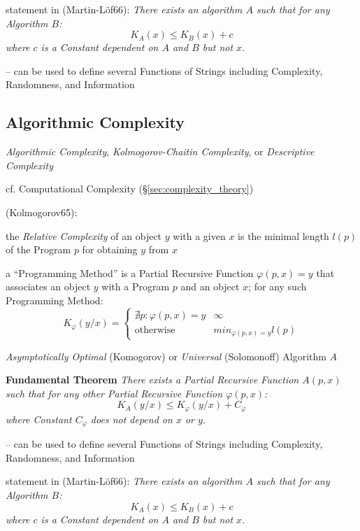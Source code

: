 statement in (Martin-L\"of66):
\emph{
  There exists an algorithm $A$ such that for any Algorithm $B$:
  \[
    K_A(x) \leq K_B(x) + c
  \]
  where $c$ is a Constant dependent on $A$ and $B$ but not $x$.
}

-- can be used to define several Functions of Strings including Complexity,
Randomness, and Information



\subsection{Algorithmic Complexity}\label{sec:algorithmic_complexity}

\emph{Algorithmic Complexity}, \emph{Kolmogorov-Chaitin Complexity}, or
\emph{Descriptive Complexity}

cf. Computational Complexity (\S\ref{sec:complexity_theory})

(Kolmogorov65):

the \emph{Relative Complexity} of an object $y$ with a given $x$
is the minimal length $l(p)$ of the Program $p$ for obtaining $y$ from $x$

a ``Programming Method'' is a Partial Recursive Function $\varphi(p, x) = y$
that associates an object $y$ with a Program $p$ and an object $x$; for any such
Programming Method:
\[
  K_\varphi(y/x) =
  \begin{cases}
    \nexists p : \varphi(p,x) = y & \infty \\
    \text{otherwise}              & min_{\varphi(p, x)=y} l(p)
  \end{cases}
\]

\emph{Asymptotically Optimal} (Komogorov) or \emph{Universal} (Solomonoff)
Algorithm $A$

\textbf{Fundamental Theorem} \emph{
  There exists a Partial Recursive Function $A(p, x)$ such that for any other
  Partial Recursive Function $\varphi(p, x)$:
  \[
    K_A(y/x) \leq K_\varphi(y/x) + C_\varphi
  \]
  where Constant $C_\varphi$ does not depend on $x$ or $y$.
}

-- can be used to define several Functions of Strings including Complexity,
Randomness, and Information

statement in (Martin-L\"of66):
\emph{
  There exists an algorithm $A$ such that for any Algorithm $B$:
  \[
    K_A(x) \leq K_B(x) + c
  \]
  where $c$ is a Constant dependent on $A$ and $B$ but not $x$.
}




